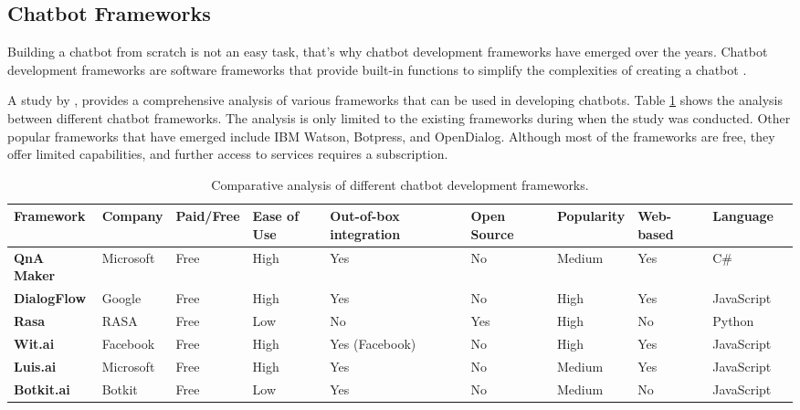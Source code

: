 \subsection{Chatbot Frameworks}

Building a chatbot from scratch is not an easy task, that’s why chatbot development frameworks have emerged over the years. Chatbot development frameworks are software frameworks that provide built-in functions to simplify the complexities of creating a chatbot \cite{geekforgeeks2024}. 

A study by \cite{omaima2020}, provides a comprehensive analysis of various frameworks that can be used in developing chatbots. Table \ref{Tab: framework_comparison} shows the analysis between different chatbot frameworks. The analysis is only limited to the existing frameworks during when the study was conducted. Other popular frameworks that have emerged include IBM Watson, Botpress, and OpenDialog. Although most of the frameworks are free, they offer limited capabilities, and further access to services requires a subscription.

\newpage

\begin{table}
	\begin{adjustbox}{max width=\textwidth}
		\begin{tabular}{|p{2.6cm}|p{2.1cm}|p{2cm}|p{2.1cm}|p{2.4cm}|p{2cm}|p{2cm}|p{2cm}|p{2cm}|p{2.3cm}|}
		\hline
		\textbf{Framework} 
		& \textbf{Company} 
		& \textbf{Paid/Free} 
		& \textbf{Ease of Use} 
		& \textbf{Out-of-box integration} 
		& \textbf{Open Source} 
		& \textbf{Popularity} 
		& \textbf{Web-based} 
		& \textbf{Language} 
		\\ \hline
		\textbf{QnA Maker} 
		& Microsoft 
		& Free 
		& High 
		& Yes 
		& No 
		& Medium 
		& Yes 
		& C\# 
		\\ \hline
		\textbf{DialogFlow} 
		& Google 
		& Free 
		& High 
		& Yes 
		& No 
		& High 
		& Yes 
		& JavaScript 
		\\ \hline
		\textbf{Rasa} 
		& RASA 
		& Free 
		& Low 
		& No 
		& Yes 
		& High 
		& No 
		& Python 
		\\ \hline
		\textbf{Wit.ai} 
		& Facebook 
		& Free 
		& High 
		& Yes (Facebook) 
		& No 
		& High 
		& Yes 
		& JavaScript 
		\\
		\hline
		\textbf{Luis.ai} 
		& Microsoft 
		& Free 
		& High 
		& Yes 
		& No 
		& Medium 
		& Yes 
		& JavaScript 
		\\
		\hline
		\textbf{Botkit.ai} 
		& Botkit 
		& Free 
		& Low 
		& Yes 
		& No 
		& Medium 
		& No 
		& JavaScript 
		\\
		\hline
		\end{tabular}
	\end{adjustbox}
	\caption{Comparative analysis of different chatbot development frameworks.}
	\label{Tab: framework_comparison}
\end{table}

